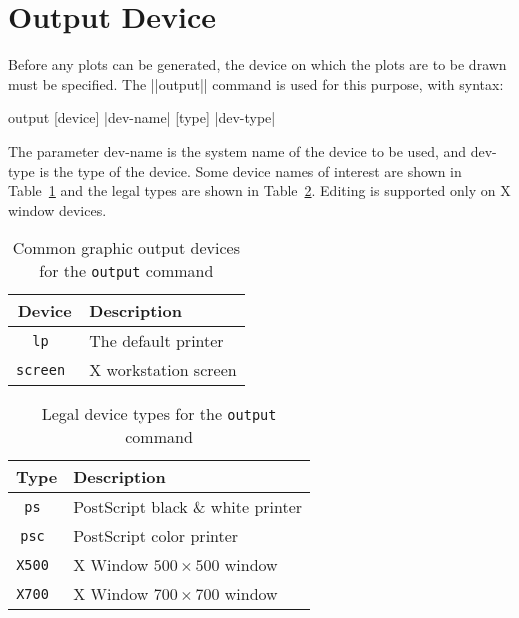 \section{Output Device}
Before any plots can be generated, the device on which the plots are to be
drawn must be specified.  The ||output|| command is used for this purpose,
with syntax:
\begin{example}
	output [device] |dev-name| [type] |dev-type|
\end{example}
The parameter {\pf dev-name} is the system name of the device to be used, and
{\pf dev-type} is the type of the device.  Some device names of interest
are shown in Table~\ref{tbl-dev} and the legal types are shown in 
Table~\ref{tbl-type}.  Editing is supported only on X window devices.

\begin{table}[tp]
	\begin{center}
	\begin{tabular}{|c|l|}
		\hline
		Device		& Description \\ \hline \hline
		\tt lp		& The default printer \\
		\tt screen	& X workstation screen \\ \hline
	\end{tabular}
	\end{center}
	\caption{Common graphic output devices for the {\tt output} command}
	\label{tbl-dev}
\end{table}

\begin{table}[tp]
	\begin{center}
	\begin{tabular}{|c|l|}
		\hline
		Type		& Description \\ \hline\hline
		\tt ps		& PostScript black \& white printer \\
		\tt psc		& PostScript color printer \\
		\tt X500	& X Window $500 \times 500$ window \\
		\tt X700 	& X Window $700 \times 700$ window \\
		\hline
	\end{tabular}
	\end{center}
	\caption{Legal device types for the {\tt output} command}
	\label{tbl-type}
\end{table}

